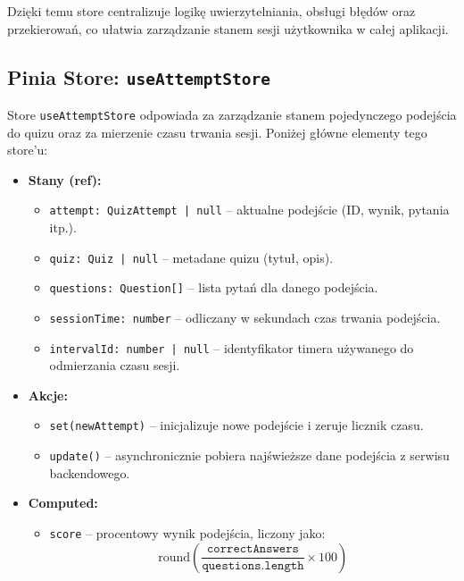 \documentclass{article}
\begin{document}
      Dzięki temu store centralizuje logikę uwierzytelniania, obsługi błędów oraz przekierowań, co ułatwia zarządzanie stanem sesji użytkownika w całej aplikacji.  

    \subsection{Pinia Store: \texttt{useAttemptStore}}
      \label{sec:attemptStore}

      Store \texttt{useAttemptStore} odpowiada za zarządzanie stanem pojedynczego podejścia do quizu oraz za mierzenie czasu trwania sesji. Poniżej główne elementy tego store’u:

      \begin{itemize}
        \item \textbf{Stany (ref):}
          \begin{itemize}
            \item \texttt{attempt: QuizAttempt | null} – aktualne podejście (ID, wynik, pytania itp.).
            \item \texttt{quiz: Quiz | null} – metadane quizu (tytuł, opis).
            \item \texttt{questions: Question[]} – lista pytań dla danego podejścia.
            \item \texttt{sessionTime: number} – odliczany w sekundach czas trwania podejścia.
            \item \texttt{intervalId: number | null} – identyfikator timera używanego do odmierzania czasu sesji.
          \end{itemize}

        \item \textbf{Akcje:}
          \begin{itemize}
            \item \texttt{set(newAttempt)} – inicjalizuje nowe podejście i zeruje licznik czasu.
            \item \texttt{update()} – asynchronicznie pobiera najświeższe dane podejścia z serwisu backendowego.
          \end{itemize}

        \item \textbf{Computed:}
          \begin{itemize}
          	\item \texttt{score} – procentowy wynik podejścia, liczony jako:
          	\[
          	\mathrm{round}\left(\frac{\texttt{correctAnswers}}{\texttt{questions.length}} \times 100\right)
          	\]
          \end{itemize}


\end{itemize}
\end{document}
